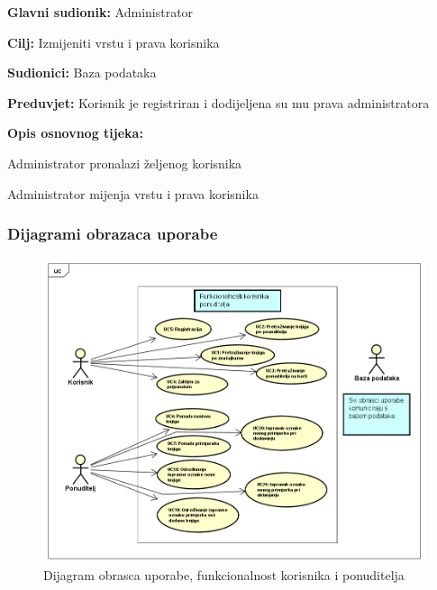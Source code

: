 					\noindent {}
					\begin{packed_item}
						\item \textbf{Glavni sudionik: }Administrator
						\item  \textbf{Cilj:} Izmijeniti vrstu i prava korisnika
						\item  \textbf{Sudionici:} Baza podataka
						\item  \textbf{Preduvjet:} Korisnik je registriran i dodijeljena su mu prava administratora
						\item  \textbf{Opis osnovnog tijeka:}
						\item[] \begin{packed_enum}
							\item Administrator pronalazi željenog korisnika
							\item Administrator mijenja vrstu i prava korisnika \\
						\end{packed_enum}
					\end{packed_item}
					
					\eject 
				
					
				\subsubsection{Dijagrami obrazaca uporabe}
				
					\begin{figure}[H]
						\includegraphics[width=\textwidth]{dijagrami/UseCaseD1.PNG} %
						\centering
						\caption{Dijagram obrasca uporabe, funkcionalnost korisnika i ponuditelja}
						\label{fig:promjene}
					\end{figure}
					
